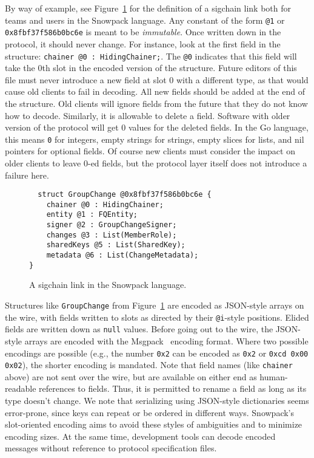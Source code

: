 By way of example, see Figure~\ref{fig:group-change} for the definition of a sigchain link both for teams
and users in the Snowpack language. Any constant of the form \texttt{@1} or \texttt{0x8fbf37f586b0bc6e}
is meant to be \textit{immutable}. Once written down in the protocol, it should never change. For instance,
look at the first field in the structure: \texttt{chainer @0 : HidingChainer;}. The \texttt{@0} indicates that this
field will take the 0th slot in the encoded version of the structure. Future editors of this file must
never introduce a new field at slot 0 with a different type, as that would cause old clients to fail
in decoding. All new fields should be added at the end of the structure. Old clients will ignore fields
from the future that they do not know how to decode. Similarly, it is allowable to delete a field.
Software with older version of the protocol will get 0 values for the deleted fields. In the Go language,
this means \texttt{0} for integers, empty strings for strings, empty slices for lists, and nil 
pointers for optional fields. Of course new clients must consider the impact on older clients to 
leave 0-ed fields, but the protocol layer itself does not introduce a failure here.

\begin{figure}[ht]
  \centering
\begin{verbatim}
  struct GroupChange @0x8fbf37f586b0bc6e {
    chainer @0 : HidingChainer;
    entity @1 : FQEntity;
    signer @2 : GroupChangeSigner;
    changes @3 : List(MemberRole);
    sharedKeys @5 : List(SharedKey);
    metadata @6 : List(ChangeMetadata);
}
\end{verbatim}
\caption{A sigchain link in the Snowpack language.}
\label{fig:group-change}
\end{figure}

Structures like \texttt{GroupChange} from Figure~\ref{fig:group-change} are
encoded as JSON-style arrays on the wire, with fields written to slots as
directed by their \texttt{@i}-style positions. Elided fields are written down as
\texttt{null} values. Before going out to the wire, the JSON-style arrays are
encoded with the Msgpack~\cite{msgpack} encoding format. Where two possible
encodings are possible (e.g., the number \texttt{0x2} can be encoded as
\texttt{0x2} or \texttt{0xcd 0x00 0x02}), the shorter encoding is mandated. Note
that field names (like \texttt{chainer} above) are not sent over the wire, but
are available on either end as human-readable references to fields. Thus, it is
permitted to rename a field as long as its type doesn't change. We note that
serializing using JSON-style dictionaries seems error-prone, since keys can
repeat or be ordered in different ways. Snowpack's slot-oriented encoding aims
to avoid these styles of ambiguities and to minimize encoding sizes. At the same
time, development tools can decode encoded messages without reference to
protocol specification files.

